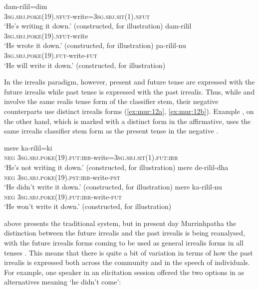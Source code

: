 \documentclass[output=paper,colorlinks,citecolor=brown]{langscibook}
\begin{document}
\ea\label{ex:mur:11}
    \ea\label{ex:mur:11a}
        \gll  dam-rilil=dim\\ 
              \textsc{3sg.sbj.poke(19).nfut-}write\textsc{=3sg.sbj.sit(1).nfut}\\
        \glt ‘He’s writing it down.’ (constructed, for illustration)
    \ex\label{ex:mur:11b}
        \gll  dam-rilil\\
              \textsc{3sg.sbj.poke(19).nfut-}write\\
        \glt ‘He wrote it down.’ (constructed, for illustration)
    \ex\label{ex:mur:11c}
        \gll  pa{}-rilil-nu\\
                 \textsc{3sg.sbj.poke(19).fut}{}-write-\textsc{fut}\\
        \glt ‘He will write it down.’ (constructed, for illustration)
    \z
\z 
 
In the irrealis paradigm, however, present and future tense are expressed with the future irrealis while past tense is expressed with the past irrealis. Thus, while  and  involve the same realis tense form of the classifier stem, their negative counterparts use distinct irrealis forms (\ref{ex:mur:12a}, \ref{ex:mur:12b}). Example , on the other hand, which is marked with a distinct form in the affirmative, uses the same irrealis classifier stem form as the present tense  in the negative .

\ea\label{ex:mur:12}
    \ea\label{ex:mur:12a}
        \gll  mere ka{}-rilil=ki\\ 
              \textsc{neg} \textsc{3sg.sbj.poke(19).fut:irr-}write\textsc{=3sg.sbj.sit(1).fut:irr}\\
        \glt ‘He’s not writing it down.’ (constructed, for illustration)
    \ex\label{ex:mur:12b}
        \gll  mere de-rilil-dha\\
              \textsc{neg} \textsc{3sg.sbj.poke(19).pst:irr}{}-write-\textsc{pst} \\
        \glt ‘He didn’t write it down.’ (constructed, for illustration)
    \ex\label{ex:mur:12c}
        \gll  mere ka-rilil-nu\\
              \textsc{neg} \textsc{3sg.sbj.poke(19).fut:irr}{}-write-\textsc{fut}\\
        \glt  ‘He won’t write it down.’ (constructed, for illustration)
\z
\z 

 above presents the traditional system, but in present day Murrinhpatha the distinction between the future irrealis and the past irrealis is being reanalysed, with the future irrealis forms coming to be used as general irrealis forms in all tenses \citep{Mansfield2014}. This means that there is quite a bit of variation in terms of how the past irrealis is expressed both across the community and in the speech of individuals. For example, one speaker in an elicitation session offered the two options in  as alternatives meaning ‘he didn’t come’:
\end{document}
